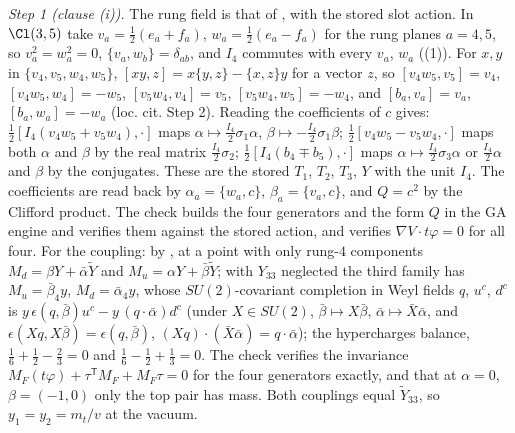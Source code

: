 \emph{Step 1 (clause (i)).} The rung field is that of , with the stored slot action. In $\Cl(3,5)$ take $v_{a} = \tfrac12(e_{a} + f_{a})$, $w_{a} = \tfrac12(e_{a} - f_{a})$ for the rung planes $a = 4, 5$, so $v_{a}^{2} = w_{a}^{2} = 0$, $\{v_{a}, w_{b}\} = \delta_{ab}$, and $I_{4}$ commutes with every $v_{a}$, $w_{a}$ ((1)). For $x, y$ in $\{v_{4}, v_{5}, w_{4}, w_{5}\}$, $[xy, z] = x\{y, z\} - \{x, z\}y$ for a vector $z$, so $[v_{4}w_{5}, v_{5}] = v_{4}$, $[v_{4}w_{5}, w_{4}] = -w_{5}$, $[v_{5}w_{4}, v_{4}] = v_{5}$, $[v_{5}w_{4}, w_{5}] = -w_{4}$, and $[b_{a}, v_{a}] = v_{a}$, $[b_{a}, w_{a}] = -w_{a}$ (loc. cit. Step 2). Reading the coefficients of $c$ gives: $\tfrac12[I_{4}(v_{4}w_{5} + v_{5}w_{4}), \cdot]$ maps $\alpha \mapsto \tfrac{I_{4}}{2}\sigma_{1}\alpha$, $\beta \mapsto -\tfrac{I_{4}}{2}\sigma_{1}\beta$; $\tfrac12[v_{4}w_{5} - v_{5}w_{4}, \cdot]$ maps both $\alpha$ and $\beta$ by the real matrix $\tfrac{I_{4}}{2}\sigma_{2}$; $\tfrac12[I_{4}(b_{4} \mp b_{5}), \cdot]$ maps $\alpha \mapsto \tfrac{I_{4}}{2}\sigma_{3}\alpha$ or $\tfrac{I_{4}}{2}\alpha$ and $\beta$ by the conjugates. These are the stored $T_{1}$, $T_{2}$, $T_{3}$, $Y$ with the unit $I_{4}$. The coefficients are read back by $\alpha_{a} = \{w_{a}, c\}$, $\beta_{a} = \{v_{a}, c\}$, and $Q = c^{2}$ by the Clifford product. The check builds the four generators and the form $Q$ in the GA engine and verifies them against the stored action, and verifies $\nabla V\cdot t\varphi = 0$ for all four. For the coupling: by , at a point with only rung-$4$ components $M_{d} = \beta Y + \bar{\alpha}\tilde{Y}$ and $M_{u} = \alpha Y + \bar{\beta}\tilde{Y}$; with $Y_{33}$ neglected the third family has $M_{u} = \bar{\beta}_{4}y$, $M_{d} = \bar{\alpha}_{4}y$, whose $SU(2)$-covariant completion in Weyl fields $q$, $u^{c}$, $d^{c}$ is $y\,\epsilon(q, \bar\beta)u^{c} - y\,(q\cdot\bar\alpha)d^{c}$ (under $X \in SU(2)$, $\bar{\beta} \mapsto X\bar{\beta}$, $\bar{\alpha} \mapsto \bar{X}\bar{\alpha}$, and $\epsilon(Xq, X\bar\beta) = \epsilon(q, \bar\beta)$, $(Xq)\cdot(\bar X\bar\alpha) = q\cdot\bar\alpha$); the hypercharges balance, $\tfrac16 + \tfrac12 - \tfrac23 = 0$ and $\tfrac16 - \tfrac12 + \tfrac13 = 0$. The check verifies the invariance $M_{F}(t\varphi) + \tau^{\mathsf T}M_{F} + M_{F}\tau = 0$ for the four generators exactly, and that at $\alpha = 0$, $\beta = (-1, 0)$ only the top pair has mass. Both couplings equal $\tilde{Y}_{33}$, so $y_{1} = y_{2} = m_{t}/v$ at the vacuum.


